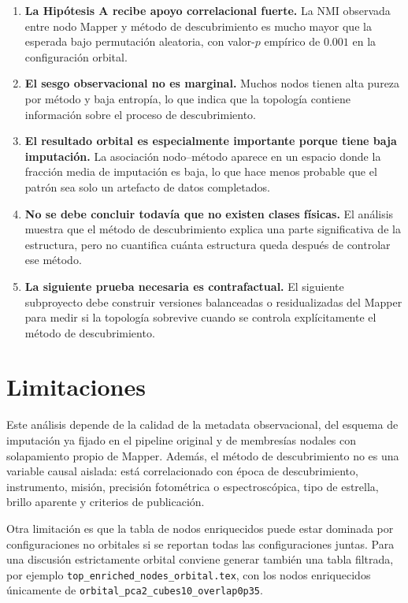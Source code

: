 \documentclass[11pt]{article}
\begin{document}
\begin{enumerate}
    \item \textbf{La Hipótesis A recibe apoyo correlacional fuerte.} La NMI observada entre nodo Mapper y método de descubrimiento es mucho mayor que la esperada bajo permutación aleatoria, con valor-$p$ empírico de $0.001$ en la configuración orbital.
    \item \textbf{El sesgo observacional no es marginal.} Muchos nodos tienen alta pureza por método y baja entropía, lo que indica que la topología contiene información sobre el proceso de descubrimiento.
    \item \textbf{El resultado orbital es especialmente importante porque tiene baja imputación.} La asociación nodo--método aparece en un espacio donde la fracción media de imputación es baja, lo que hace menos probable que el patrón sea solo un artefacto de datos completados.
    \item \textbf{No se debe concluir todavía que no existen clases físicas.} El análisis muestra que el método de descubrimiento explica una parte significativa de la estructura, pero no cuantifica cuánta estructura queda después de controlar ese método.
    \item \textbf{La siguiente prueba necesaria es contrafactual.} El siguiente subproyecto debe construir versiones balanceadas o residualizadas del Mapper para medir si la topología sobrevive cuando se controla explícitamente el método de descubrimiento.
\end{enumerate}

\section{Limitaciones}

Este análisis depende de la calidad de la metadata observacional, del esquema de imputación ya fijado en el pipeline original y de membresías nodales con solapamiento propio de Mapper. Además, el método de descubrimiento no es una variable causal aislada: está correlacionado con época de descubrimiento, instrumento, misión, precisión fotométrica o espectroscópica, tipo de estrella, brillo aparente y criterios de publicación.

Otra limitación es que la tabla de nodos enriquecidos puede estar dominada por configuraciones no orbitales si se reportan todas las configuraciones juntas. Para una discusión estrictamente orbital conviene generar también una tabla filtrada, por ejemplo \texttt{top\_enriched\_nodes\_orbital.tex}, con los nodos enriquecidos únicamente de \texttt{orbital\_pca2\_cubes10\_overlap0p35}.
\end{document}
